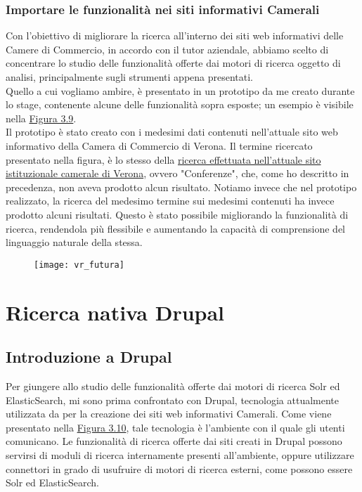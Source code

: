 			\subsubsection{Importare le funzionalità nei siti informativi Camerali}
			Con l'obiettivo di migliorare la ricerca all'interno dei siti web informativi delle Camere di Commercio, in accordo con il tutor aziendale, abbiamo scelto di concentrare lo studio delle funzionalità offerte dai motori di ricerca oggetto di analisi, principalmente sugli strumenti appena presentati. \\
			Quello a cui vogliamo ambire, è presentato in un prototipo da me creato durante lo stage, contenente alcune delle funzionalità sopra esposte; un esempio è visibile nella \hyperref[img:evoluzioneVR]{Figura 3.9}. \\
			Il prototipo è stato creato con i medesimi dati contenuti nell'attuale sito web informativo della Camera di Commercio di Verona. Il termine ricercato presentato nella figura, è lo stesso della \hyperref[img:conferenze]{ricerca effettuata nell'attuale sito istituzionale camerale di Verona}, ovvero "Conferenze", che, come ho descritto in precedenza, non aveva prodotto alcun risultato. Notiamo invece che nel prototipo realizzato, la ricerca del medesimo termine sui medesimi contenuti ha invece prodotto alcuni risultati. Questo è stato possibile migliorando la funzionalità di ricerca, rendendola più flessibile e aumentando la capacità di comprensione del linguaggio naturale della stessa.

			\label{img:evoluzioneVR}
			\begin{figure}[htbp]
				\begin{center}
					\texttt{[image: vr\_futura]}
				\end{center}
			\end{figure}

	\section{Ricerca nativa Drupal}

		\subsection{Introduzione a Drupal}
		Per giungere allo studio delle funzionalità offerte dai motori di ricerca \gls{Solr} ed \gls{ElasticSearch}, mi sono prima confrontato con \gls{Drupal}, tecnologia attualmente utilizzata da \nomeAzienda per la creazione dei siti web informativi Camerali. Come viene presentato nella \hyperref[img:cciaa_drupal]{Figura 3.10}, tale tecnologia è l'ambiente con il quale gli utenti comunicano. Le funzionalità di ricerca offerte dai siti creati in \gls{Drupal} possono servirsi di moduli di ricerca internamente presenti all'ambiente, oppure utilizzare connettori in grado di usufruire di motori di ricerca esterni, come possono essere \gls{Solr} ed \gls{ElasticSearch}.
		

